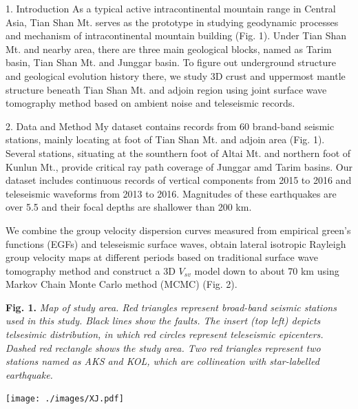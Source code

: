 \documentclass[
    landscape,      %
    paperwidth = 1120mm,
    paperheight = 820mm,
    fontscale = 0.45,
    margin = 1.7cm,
]{baposter}
\begin{document}
\begin{poster}
\begin{posterbox}[column=0, row=0]{1. Introduction}
\setlength{\parskip}{3pt}
As a typical active intracontinental mountain range in Central Asia, Tian
Shan Mt. serves as the prototype in studying geodynamic processes and mechanism
of intracontinental mountain building (Fig. 1). Under Tian Shan Mt. and nearby area,
there are three main geological blocks, named as Tarim basin, Tian Shan Mt.
and Junggar basin. To figure out underground structure and geological evolution history there,
we study 3D crust and uppermost mantle structure beneath Tian Shan Mt. and adjoin region
using joint surface wave tomography method based on ambient noise and teleseismic records.
\end{posterbox}

\begin{posterbox}[column=0, below=auto]{2. Data and Method}
\setlength{\parskip}{3pt}
My dataset contains records from 60 brand-band seismic stations, mainly
locating at foot of Tian Shan Mt. and adjoin area (Fig. 1).
Several stations, situating at the sounthern foot of Altai Mt. and northern foot of Kunlun Mt.,
provide critical ray path coverage of Junggar amd Tarim basins. Our dataset includes continuous records
of vertical components from 2015 to 2016 and teleseismic waveforms from 2013 to 2016.
Magnitudes of these earthquakes are over 5.5 and their focal depths are shallower than 200 km.

We combine the group velocity dispersion curves measured from empirical green's functions (EGFs) and teleseismic surface waves,
obtain lateral isotropic Rayleigh group velocity maps at different periods based on traditional surface wave tomography method
and  construct a 3D $V_{sv}$ model down to about 70 km using Markov Chain Monte Carlo method (MCMC) (Fig. 2).

\begin{center}

\begin{minipage}{0.3\textwidth}
\footnotesize
\textbf{Fig. 1.}
\itshape
Map of study area. Red triangles represent broad-band seismic stations
used in this study. Black lines show the faults.
The insert (top left) depicts telsesimic distribution, in which red circles represent
teleseismic epicenters.
Dashed red rectangle shows the study area. Two red triangles represent two stations
named as AKS and KOL, which are collineation with star-labelled earthquake.
\end{minipage}
\begin{minipage}{0.45\textwidth}
\texttt{[image: ./images/XJ.pdf]}
\end{minipage}
\hspace{0.1cm}
\end{center}



\end{posterbox}
\end{poster}
\end{document}
